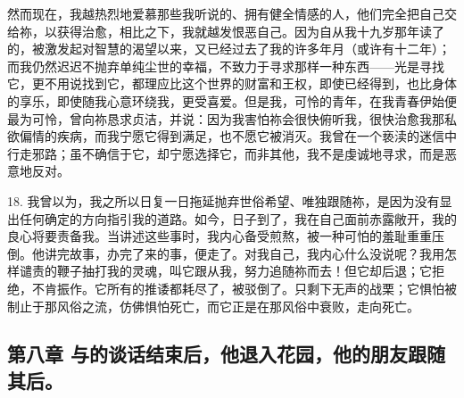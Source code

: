 然而现在，我越热烈地爱慕那些我听说的、拥有健全情感的人，他们完全把自己交给祢，以获得治愈，相比之下，我就越发恨恶自己。因为自从我十九岁那年读了的，被激发起对智慧的渴望以来，又已经过去了我的许多年月（或许有十二年）；而我仍然迟迟不抛弃单纯尘世的幸福，不致力于寻求那样一种东西——光是寻找它，更不用说找到它，都理应比这个世界的财富和王权，即使已经得到，也比身体的享乐，即使随我心意环绕我，更受喜爱。但是我，可怜的青年，在我青春伊始便最为可怜，曾向祢恳求贞洁，并说：因为我害怕祢会很快俯听我，很快治愈我那私欲偏情的疾病，而我宁愿它得到满足，也不愿它被消灭。我曾在一个亵渎的迷信中行走邪路；虽不确信于它，却宁愿选择它，而非其他，我不是虔诚地寻求，而是恶意地反对。\par

18. 我曾以为，我之所以日复一日拖延抛弃世俗希望、唯独跟随祢，是因为没有显出任何确定的方向指引我的道路。如今，日子到了，我在自己面前赤露敞开，我的良心将要责备我。当讲述这些事时，我内心备受煎熬，被一种可怕的羞耻重重压倒。他讲完故事，办完了来的事，便走了。对我自己，我内心什么没说呢？我用怎样谴责的鞭子抽打我的灵魂，叫它跟从我，努力追随祢而去！但它却后退；它拒绝，不肯振作。它所有的推诿都耗尽了，被驳倒了。只剩下无声的战栗；它惧怕被制止于那风俗之流，仿佛惧怕死亡，而它正是在那风俗中衰败，走向死亡。\par


\subsection{第八章 与的谈话结束后，他退入花园，他的朋友跟随其后。}

